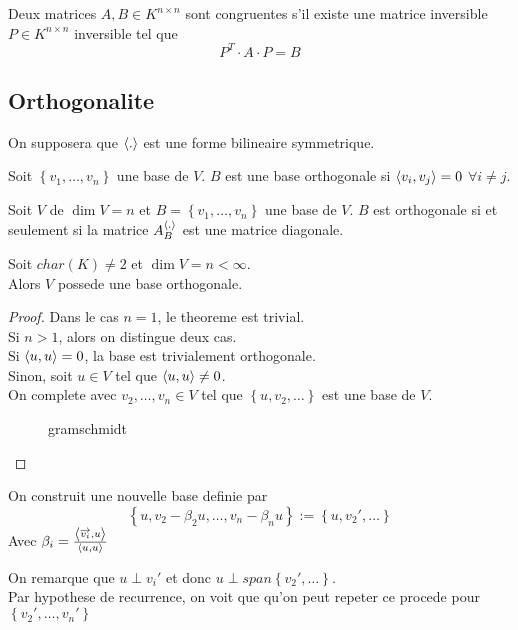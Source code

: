 \documentclass[../main.tex]{subfiles}
\begin{document}
\begin{defn}
	Deux matrices $A,B \in K^{n\times n}$ sont congruentes s'il existe une matrice inversible $P \in K^{n\times n}$ inversible tel que 
	\[ 
	P^{T}\cdot A \cdot P = B
	\]
	
\end{defn}
\subsection{Orthogonalite}
On supposera que $\left\langle.\right\rangle$ est une forme bilineaire symmetrique.
\begin{defn}
	Soit $ \left\{ v_1, \ldots, v_n \right\} $ une base de $V$. $B$ est une base orthogonale si $\left\langle v_i,v_j\right\rangle =0$ $\forall i \neq j$.
\end{defn}
\begin{lemma}
Soit $V$ de $\dim V = n$ et $B = \left\{ v_1, \ldots, v_n \right\} $ une base de $V$. $B$ est orthogonale si et seulement si la matrice $A_B^{\left\langle.\right\rangle}$ est une matrice diagonale.
\end{lemma}
\begin{thm}
	Soit $char( K) \neq 2$ et $\dim V = n < \infty $.\\
	Alors $V$ possede une base orthogonale.
\end{thm}
\begin{proof}
Dans le cas $n=1$, le theoreme est trivial.\\
Si $n>1$, alors on distingue deux cas.\\
Si $\left\langle u,u\right\rangle = 0$, la base est trivialement orthogonale.\\
Sinon, soit $u \in V$ tel que $\left\langle u,u\right\rangle \neq 0$.\\
On complete avec $v_2, \ldots, v_n \in V$ tel que $ \left\{ u, v_2, \ldots \right\} $ est une base de $V$.\\
\begin{figure}[H]
    \centering
    \caption{gramschmidt}
    \label{fig:gramschmidt}
\end{figure}
\end{proof}
On construit une nouvelle base definie par
\[ 
\left\{ u, v_2- \beta_2 u , \ldots, v_n - \beta_n u \right\}  := \left\{ u, v_2', \ldots \right\} 
\]
Avec $\beta_i = \frac{\left\langle \overrightarrow{v_i},u\right\rangle }{\left\langle u,u\right\rangle }$

On remarque que $u \perp v_i'$ et donc $u \perp span \left\{ v_2', \ldots \right\} $.\\
Par hypothese de recurrence, on voit que qu'on peut repeter ce procede pour $ \left\{ v_2'
, \ldots, v_n'\right\} $
\end{document}
